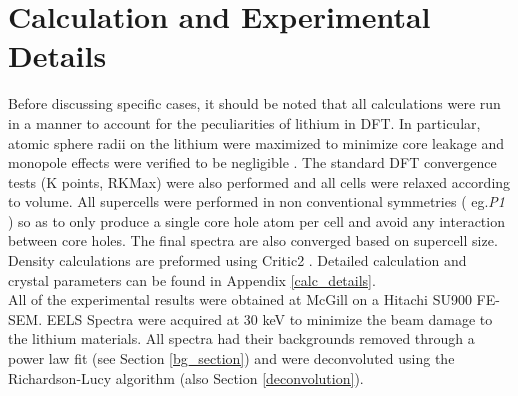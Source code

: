 \section{Calculation and Experimental Details} \label{calc_section}
Before discussing specific cases, it should be noted that all calculations were run in a manner to account for the peculiarities of lithium in DFT. In particular, atomic sphere radii on the lithium were maximized to minimize core leakage and monopole effects were verified to be negligible \cite{mauchamp_ab_2006}.  The standard DFT convergence tests (K points, RKMax) were also performed and all cells were relaxed according to volume.  All supercells were performed in non conventional symmetries ( eg.\textit{P1} ) so as to only produce a single core hole atom per cell and avoid any interaction between core holes. The final spectra are also converged based on supercell size.  Density calculations are preformed using Critic2 \cite{critic2}.   Detailed calculation and crystal parameters can be found in Appendix \ref{calc_details}. \\



All of the experimental results were obtained at McGill on a Hitachi SU900 FE-SEM.  EELS Spectra were acquired at 30 keV to minimize the beam damage to the lithium materials.  All spectra had their backgrounds removed through a power law fit (see Section \ref{bg_section}) and were deconvoluted using the Richardson-Lucy algorithm (also Section \ref{deconvolution}).

